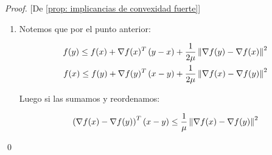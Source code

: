 \begin{proof}{[De \ref{prop: implicancias de convexidad fuerte}]}
\begin{enumerate}
		\item Notemos que por el punto anterior:
		
		\begin{equation*}
			\begin{aligned}
				f(y) \leq f(x) + \nabla f(x)^T \left(y-x\right) + \frac{1}{2\mu} \left\lVert\nabla f(y) - \nabla f(x)\right\rVert^2 \\
				f(x) \leq f(y) + \nabla f(y)^T \left(x-y\right) + \frac{1}{2\mu} \left\lVert\nabla f(x) - \nabla f(y)\right\rVert^2 
			\end{aligned}
		\end{equation*}
		
		Luego si las sumamos y reordenamos:
		
		\begin{equation*}
			\left(\nabla f(x) - \nabla f(y)\right)^T \left(x-y\right) \leq \frac{1}{\mu} \left\lVert\nabla f(x) - \nabla f(y)\right\rVert^2 
		\end{equation*}
		
	\end{enumerate}\qed
\end{proof}

